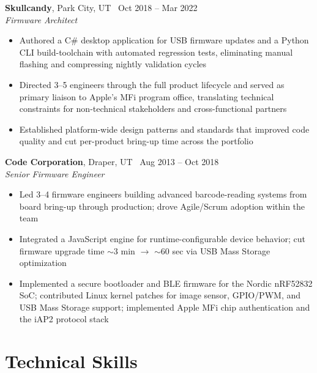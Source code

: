 \documentclass[10.5pt, letterpaper]{article}
\newcommand{\jobentry}[4]{%
  \noindent
  \textbf{\color{accent}#1}\textcolor{muted}{, #2 \textbullet\ #4}\\
  \textit{#3}%
}
\begin{document}
\vspace{2pt}

\jobentry{Skullcandy}{Park City, UT}{Firmware Architect}{Oct 2018 -- Mar 2022}
\begin{itemize}
  \item Authored a C\# desktop application for USB firmware updates and a
        Python CLI build-toolchain with automated regression tests, eliminating
        manual flashing and compressing nightly validation cycles
  \item Directed 3--5 engineers through the full product lifecycle and served as
        primary liaison to Apple's MFi program office, translating technical
        constraints for non-technical stakeholders and cross-functional partners
  \item Established platform-wide design patterns and standards that improved
        code quality and cut per-product bring-up time across the portfolio
\end{itemize}

\vspace{2pt}

\jobentry{Code Corporation}{Draper, UT}{Senior Firmware Engineer}{Aug 2013 -- Oct 2018}
\begin{itemize}
  \item Led 3--4 firmware engineers building advanced barcode-reading systems
        from board bring-up through production; drove Agile/Scrum adoption
        within the team
  \item Integrated a JavaScript engine for runtime-configurable device behavior;
        cut firmware upgrade time $\sim$3 min $\to$ $\sim$60 sec via USB Mass
        Storage optimization
  \pagebreak
  \item Implemented a secure bootloader and BLE firmware for the Nordic
        nRF52832 SoC; contributed Linux kernel patches for image sensor,
        GPIO/PWM, and USB Mass Storage support; implemented Apple MFi chip
        authentication and the iAP2 protocol stack
\end{itemize}

\section{Technical Skills}
\end{document}
